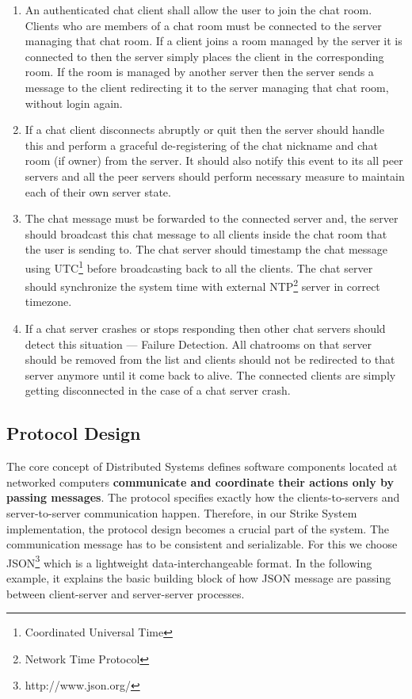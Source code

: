 \documentclass[dareport.tex]{subfiles}
\begin{document}
\begin{enumerate}[leftmargin=*]
\item An authenticated chat client shall allow the user to join the chat room. Clients who are members of a chat room must be connected to the server managing that chat room. If a client joins a room managed by the server it is connected to then the server simply places the client in the corresponding room. If the room is managed by another server then the server sends a message to the client redirecting it to the server managing that chat room, without login again.

\item If a chat client disconnects abruptly or quit then the server should handle this and perform a graceful de-registering of the chat nickname and chat room (if owner) from the server. It should also notify this event to its all peer servers and all the peer servers should perform necessary measure to maintain each of their own server state.

\item The chat message must be forwarded to the connected server and, the server should broadcast this chat message to all clients inside the chat room that the user is sending to. The chat server should timestamp the chat message using UTC\footnote{Coordinated Universal Time} before broadcasting back to all the clients. The chat server should synchronize the system time with external NTP\footnote{Network Time Protocol} server in correct timezone.

\item If a chat server crashes or stops responding then other chat servers should detect this situation --- Failure Detection. All chatrooms on that server should be removed from the list and clients should not be redirected to that server anymore until it come back to alive. The connected clients are simply getting disconnected in the case of a chat server crash.

\end{enumerate}


\subsection{Protocol Design}
The core concept of Distributed Systems defines software components 
located at networked computers \textbf{communicate and coordinate their actions only by passing messages}\cite{coulouris}. The protocol specifies exactly how the clients-to-servers and server-to-server communication happen. Therefore, in our Strike System implementation, the protocol design becomes a crucial part of the system. The communication message has to be consistent and serializable. For this we choose JSON\footnote{http://www.json.org/} which is a lightweight data-interchangeable format. In the following example, it explains the basic building block of how JSON message are passing between client-server and server-server processes.
\end{document}
